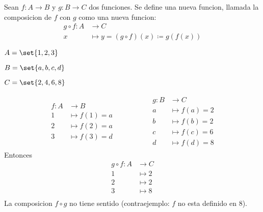 \begin{definition}
	Sean \(f \colon A \to B \) y \(g \colon B \to C \) dos funciones. Se define una nueva funcion, llamada la composicion de \(f \) con \(g \) como una nueva funcion:
	\[
		\begin{aligned}
			g \circ f\colon A & \longrightarrow C                                 \\
			x                 & \longmapsto y = (g \circ f)(x) \coloneqq  g(f(x))
		\end{aligned}
	\]
\end{definition}

\begin{example}
	\(A = \set{1,2,3}\)

	\(B = \set{a,b,c,d }\)

	\(C = \set{2,4,6,8 }\)

	\[
		\begin{array}{lr}
			\begin{aligned}
				f \colon A & \longrightarrow B     \\
				1          & \longmapsto f (1) = a \\
				2          & \longmapsto f (2) = a \\
				3          & \longmapsto f (3) = d
			\end{aligned} \qquad & \qquad
			\begin{aligned}
				g \colon B & \longrightarrow C     \\
				a          & \longmapsto f (a) = 2 \\
				b          & \longmapsto f (b) = 2 \\
				c          & \longmapsto f (c) = 6 \\
				d          & \longmapsto f (d) = 8
			\end{aligned}
		\end{array}
	\]
	Entonces
	\[
		\begin{aligned}
			g \circ f\colon A & \longrightarrow C \\
			1                 & \longmapsto 2     \\
			2                 & \longmapsto 2     \\
			3                 & \longmapsto 8     \\
		\end{aligned}
	\]
	La composicion \(f \circ  g \) no tiene sentido (contraejemplo: \(f \) no esta definido en 8).

\end{example}
